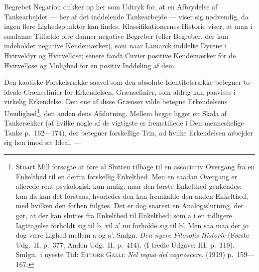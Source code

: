 \documentclass[12pt]{article}
\newcommand{\opage}[1]{\marginnote{\footnotesize\textit{[#1]}}}
\begin{document}
Begrebet Negation dukker op her som Udtryk for, at
en Afbrydelse af Tankearbejdet --- her af det inddelende
Tankearbejde --- viser sig nødvendig, da ingen flere Lighedspunkter
kan findes. Klassifikationernes Historie viser,
at man i saadanne Tilfælde ofte danner negative Begreber
(eller Begreber, der kun indeholder negative Kendemærker),
som naar Lamarck inddelte Dyrene i Hvirveldyr og Hvirvelløse;
senere fandt Cuvier positive Kendemærker for de
Hvirvelløse og Mulighed for en positiv Inddeling af dem.

Den kaotiske Forskelsrække saavel som den absolute
Identitetsrække betegner to ideale Grænselinier for Erkendelsen,
Grænselinier, som aldrig kan paavises i virkelig
Erkendelse. Den ene af disse Grænser vilde betegne Erkendelsens
Umulighed\footnote{Stuart Mill forsøgte at føre al Slutten
tilbage til en associativ Overgang fra en Enkelthed til en derfra forskellig
Enkelthed. Men en saadan Overgang er allerede rent psykologisk kun mulig,
naar den første Enkelthed genkendes; kun da kan det forstaas, hvorledes den
kan fremkalde den anden Enkelthed, med hvilken den forhen fulgtes. Det er
dog snarest en Analogislutning, der gør, at der kan sluttes \guillemotright fra
Enkelthed til Enkelthed\guillemotleft: som a i en tidligere Iagttagelse forholdt
sig til b, vil a' nu forholde sig til b'. Men saa maa der jo dog være Lighed
mellem a og a'. Smlgn. \textit{Den nyere Filosofis Historie} (Første Udg.\ II,
p.~377; Anden Udg.\ II, p.~414). (I tredie Udgave: III, p.~119). Smlgn.\ i
nyeste Tid: \textsc{Ettore Galli}: \textit{Nel regno del cognoscere.} (1919)
p.~159---167.}, den anden dens Afslutning. Mellem
\opage{37} begge ligger en Skala af Tankerækker (af hvilke nogle af de
vigtigste er fremstillede i \guillemotright Den menneskelige Tanke\guillemotleft{}
p.~162---174), der betegner forskellige Trin, ad hvilke Erkendelsen
arbejder sig hen imod sit Ideal. ---
\end{document}
